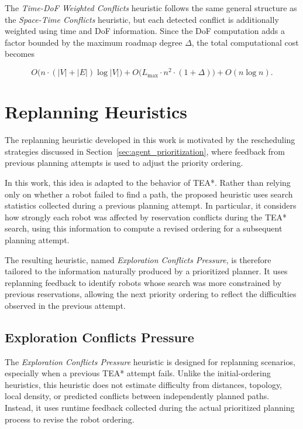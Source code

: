 The \textit{Time-DoF Weighted Conflicts} heuristic follows the same general structure as the
\textit{Space-Time Conflicts} heuristic, but each detected conflict is additionally weighted using
time and DoF information. Since the DoF computation adds a factor bounded by the maximum roadmap
degree \(\Delta\), the total computational cost becomes

\begin{equation}
\label{eq:time_dof_weighted_conflicts_heuristic}
    O\bigl(n \cdot (|V| + |E|)\log |V|\bigr)
    + O\bigl(L_{\max} \cdot n^2 \cdot (1+\Delta)\bigr)
    + O(n \log n).
\end{equation}


\section{Replanning Heuristics}
\label{sec:replanning_heuristics}
\hspace{\parindent}
The replanning heuristic developed in this work is motivated by the rescheduling strategies discussed
in Section~\ref{sec:agent_prioritization}, where feedback from previous planning attempts is used to
adjust the priority ordering.

In this work, this idea is adapted to the behavior of TEA*. Rather than relying only on whether a
robot failed to find a path, the proposed heuristic uses search statistics collected during a
previous planning attempt. In particular, it considers how strongly each robot was affected by
reservation conflicts during the TEA* search, using this information to compute a revised ordering
for a subsequent planning attempt.

The resulting heuristic, named \textit{Exploration Conflicts Pressure}, is therefore tailored to the
information naturally produced by a prioritized planner. It uses replanning feedback to identify
robots whose search was more constrained by previous reservations, allowing the next priority
ordering to reflect the difficulties observed in the previous attempt.

\subsection{Exploration Conflicts Pressure}
\label{subsec:exploration_conflicts_pressure}
\hspace{\parindent}
The \textit{Exploration Conflicts Pressure} heuristic is designed for replanning scenarios, especially when a previous TEA* attempt fails. Unlike the initial-ordering heuristics, this heuristic does not estimate difficulty from distances, topology, local density, or predicted conflicts between independently planned paths. Instead, it uses runtime feedback collected during the actual prioritized planning process to revise the robot ordering.

